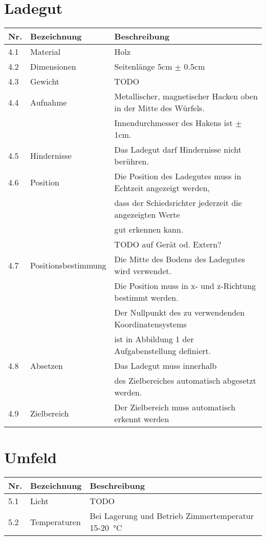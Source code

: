 \documentclass[a4paper]{report}
\begin{document}
\section{Ladegut}
\begin{tabular}{|l|l|l|}
	\hline 
	\textbf{Nr.} & \textbf{Bezeichnung} & \textbf{Beschreibung} \\
	\hline
	4.1 & Material & Holz \\
	\hline
	4.2 & Dimensionen & Seitenlänge 5cm $\pm$ 0.5cm \\
	\hline
	4.3 & Gewicht & TODO \\
	\hline
	4.4 & Aufnahme & Metallischer, magnetischer Hacken oben in der Mitte des Würfels.\\
	& & Innendurchmesser des Hakens ist $\pm$ 1cm. \\
	\hline
	4.5 & Hindernisse & Das Ladegut darf Hindernisse nicht berühren. \\
	\hline
	4.6 & Position & Die Position des Ladegutes muss in Echtzeit angezeigt werden,\\
	& & dass der Schiedsrichter jederzeit die angezeigten Werte\\
	& & gut erkennen kann.\\
	& & TODO auf Gerät od. Extern? \\
	\hline
	4.7 & Positionsbestimmung & Die Mitte des Bodens des Ladegutes wird verwendet.\\
	& & Die Position muss in x- und z-Richtung bestimmt werden.\\
	& & Der Nullpunkt des zu verwendenden Koordinatensystems\\
	& & ist in Abbildung 1 der Aufgabenstellung definiert. \\
	\hline
	4.8 & Absetzen & Das Ladegut muss innerhalb\\
	& & des Zielbereiches automatisch abgesetzt werden. \\
	\hline
	4.9 & Zielbereich & Der Zielbereich muss automatisch erkennt werden\\
	\hline
\end{tabular}

\section{Umfeld}
\begin{tabular}{|l|l|l|}
	\hline 
	\textbf{Nr.} & \textbf{Bezeichnung} & \textbf{Beschreibung} \\
	\hline
	5.1 & Licht & TODO \\
	\hline
	5.2 & Temperaturen & Bei Lagerung und Betrieb Zimmertemperatur 15-\SI{20}{\degreeCelsius}\\
	\hline
\end{tabular}
\end{document}
